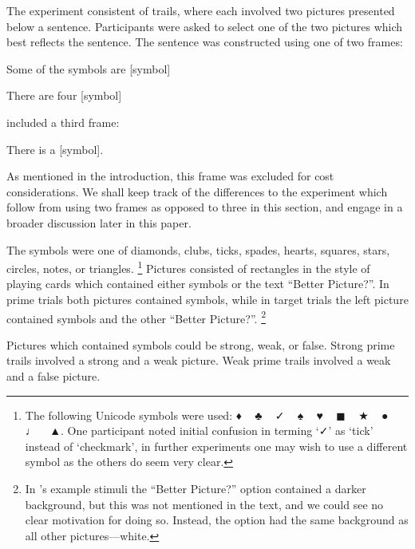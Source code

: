 \documentclass[10pt]{article}
\begin{document}
\begin{multicols}{2}
The experiment consistent of trails, where each involved two pictures presented below a sentence.
Participants were asked to select one of the two pictures which best reflects the sentence.
The sentence was constructed using one of two frames:
\begin{enumerate*}[label=(\roman*)]
\item Some of the symbols are [symbol]
\item There are four [symbol]
\end{enumerate*}
\citeauthor{Bott:2016aa} included a third frame:
\begin{enumerate*}[label=(\roman*), resume]
\item There is a [symbol].
\end{enumerate*}
As mentioned in the introduction, this frame was excluded for cost considerations.
We shall keep track of the differences to the experiment which follow from using two frames as opposed to three in this section, and engage in a broader discussion later in this paper.

The symbols were one of diamonds, clubs, ticks, spades, hearts, squares, stars, circles, notes, or triangles.\nolinebreak
\footnote{The following Unicode symbols were used: {\space\unifont ♦\space} \mbox{ }  {\space\unifont ♣\space} \mbox{ } {\space\unifont ✓\space} \mbox{ } {\space\unifont ♠\space} \mbox{ } {\space\unifont ♥\space} \mbox{ } {\space\unifont ◼\space} \mbox{ } {\space\unifont ★\space} \mbox{ } {\space\unifont ●\space} \mbox{ } {\space\unifont ♩\space} \mbox{ } {\space\unifont ▲}.
  One participant noted initial confusion in terming `{\unifont ✓}' as `tick' instead of `checkmark', in further experiments one may wish to use a different symbol as the others do seem very clear.}
Pictures consisted of rectangles in the style of playing cards which contained either symbols or the text ``Better Picture?''.
In prime trials both pictures contained symbols, while in target trials the left picture contained symbols and the other ``Better Picture?''.\nolinebreak
\footnote{In \citeauthor{Bott:2016aa}'s example stimuli the ``Better Picture?'' option contained a darker background, but this was not mentioned in the text, and we could see no clear motivation for doing so.
Instead, the option had the same background as all other pictures---white.}

Pictures which contained symbols could be strong, weak, or false.
Strong prime trails involved a strong and a weak picture.
Weak prime trails involved a weak and a false picture.


\end{multicols}
\end{document}
